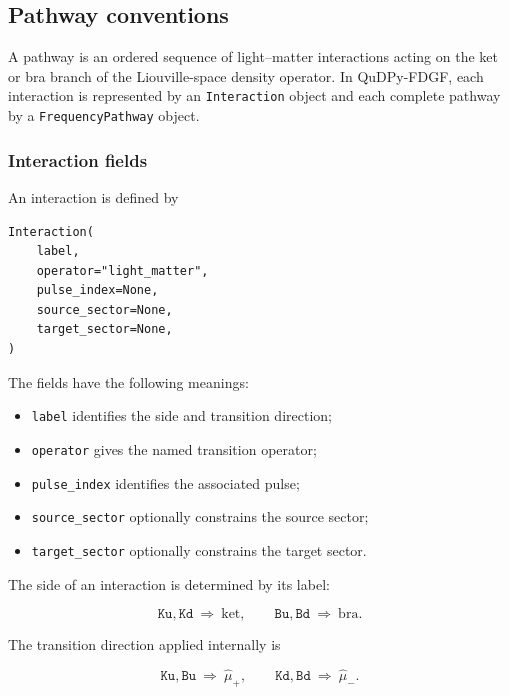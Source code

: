 \documentclass[11pt]{article}
\begin{document}
\subsection{\textbf{Pathway conventions}}
\label{sec:pathway-conventions}

A pathway is an ordered sequence of light--matter interactions acting on the ket or bra branch of the Liouville-space density operator. In QuDPy-FDGF, each interaction is represented by an \texttt{Interaction} object and each complete pathway by a \texttt{FrequencyPathway} object.



\subsubsection{Interaction fields}

An interaction is defined by

\begin{verbatim}
Interaction(
    label,
    operator="light_matter",
    pulse_index=None,
    source_sector=None,
    target_sector=None,
)
\end{verbatim}

The fields have the following meanings:

\begin{itemize}
    \item \texttt{label} identifies the side and transition direction;
    \item \texttt{operator} gives the named transition operator;
    \item \texttt{pulse\_index} identifies the associated pulse;
    \item \texttt{source\_sector} optionally constrains the source sector;
    \item \texttt{target\_sector} optionally constrains the target sector.
\end{itemize}

The side of an interaction is determined by its label:

\begin{equation}
\texttt{Ku},\texttt{Kd}\ \Rightarrow\ \text{ket},
\qquad
\texttt{Bu},\texttt{Bd}\ \Rightarrow\ \text{bra}.
\end{equation}

The transition direction applied internally is

\begin{equation}
\texttt{Ku},\texttt{Bu}\ \Rightarrow\ \hat{\mu}_{+},
\qquad
\texttt{Kd},\texttt{Bd}\ \Rightarrow\ \hat{\mu}_{-}.
\end{equation}
\end{document}
